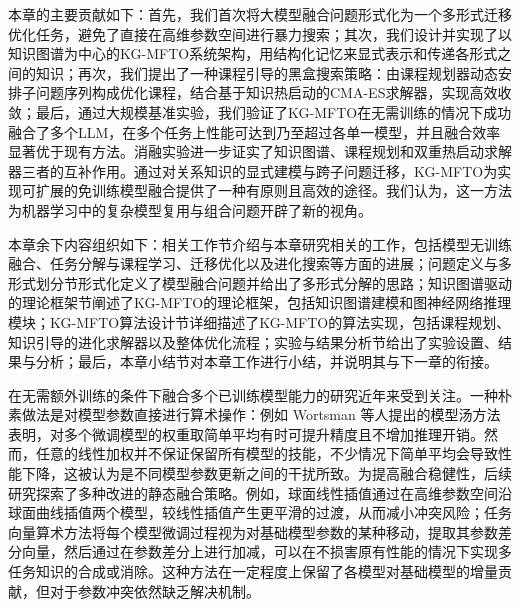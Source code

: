 \documentclass[../main.tex]{subfiles}
\begin{document}
本章的主要贡献如下：首先，我们首次将大模型融合问题形式化为一个多形式迁移优化任务，避免了直接在高维参数空间进行暴力搜索；其次，我们设计并实现了以知识图谱为中心的KG-MFTO系统架构，用结构化记忆来显式表示和传递各形式之间的知识；再次，我们提出了一种课程引导的黑盒搜索策略：由课程规划器动态安排子问题序列构成优化课程，结合基于知识热启动的CMA-ES求解器，实现高效收敛；最后，通过大规模基准实验，我们验证了KG-MFTO在无需训练的情况下成功融合了多个LLM，在多个任务上性能可达到乃至超过各单一模型，并且融合效率显著优于现有方法。消融实验进一步证实了知识图谱、课程规划和双重热启动求解器三者的互补作用。通过对关系知识的显式建模与跨子问题迁移，KG-MFTO为实现可扩展的免训练模型融合提供了一种有原则且高效的途径。我们认为，这一方法为机器学习中的复杂模型复用与组合问题开辟了新的视角。

本章余下内容组织如下：相关工作节介绍与本章研究相关的工作，包括模型无训练融合、任务分解与课程学习、迁移优化以及进化搜索等方面的进展；问题定义与多形式划分节形式化定义了模型融合问题并给出了多形式分解的思路；知识图谱驱动的理论框架节阐述了KG-MFTO的理论框架，包括知识图谱建模和图神经网络推理模块；KG-MFTO算法设计节详细描述了KG-MFTO的算法实现，包括课程规划、知识引导的进化求解器以及整体优化流程；实验与结果分析节给出了实验设置、结果与分析；最后，本章小结节对本章工作进行小结，并说明其与下一章的衔接。


在无需额外训练的条件下融合多个已训练模型能力的研究近年来受到关注。一种朴素做法是对模型参数直接进行算术操作：例如 Wortsman 等人提出的模型汤方法表明，对多个微调模型的权重取简单平均有时可提升精度且不增加推理开销。然而，任意的线性加权并不保证保留所有模型的技能，不少情况下简单平均会导致性能下降，这被认为是不同模型参数更新之间的干扰所致。为提高融合稳健性，后续研究探索了多种改进的静态融合策略。例如，球面线性插值通过在高维参数空间沿球面曲线插值两个模型，较线性插值产生更平滑的过渡，从而减小冲突风险；任务向量算术方法将每个模型微调过程视为对基础模型参数的某种移动，提取其参数差分向量，然后通过在参数差分上进行加减，可以在不损害原有性能的情况下实现多任务知识的合成或消除。这种方法在一定程度上保留了各模型对基础模型的增量贡献，但对于参数冲突依然缺乏解决机制。
\end{document}
